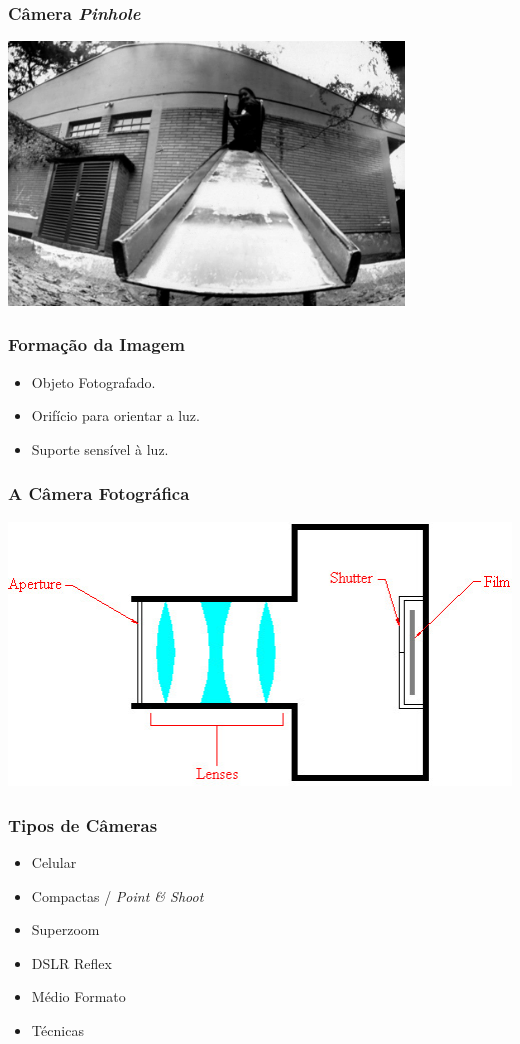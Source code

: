 \begin{frame}
    \frametitle{Câmera \textit{Pinhole}}
\begin{center}
    \includegraphics[height=7cm]{images/latamagica.jpg}
\end{center}
\end{frame}

\begin{frame}
    \frametitle{Formação da Imagem}
    \begin{itemize}
        \item Objeto Fotografado.
        \item Orifício para orientar a luz.
        \item Suporte sensível à luz.
    \end{itemize}
\end{frame}

\begin{frame}
    \frametitle{A Câmera Fotográfica}
\begin{center}
    \includegraphics[height=7cm]{images/basic_camera.jpg}
\end{center}
\end{frame}

\begin{frame}
    \frametitle{Tipos de Câmeras}
    \begin{itemize}
        \item Celular
        \item Compactas / \textit{Point \& Shoot}
        \item Superzoom
        \item DSLR Reflex
        \item Médio Formato
        \item Técnicas
    \end{itemize}
\end{frame}

